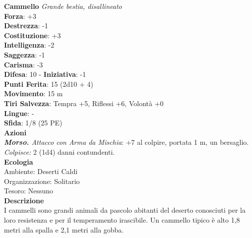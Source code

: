 \begin{multicols}{2}
\medskip\textbf{Cammello}
\emph{Grande bestia, disallineato}\\
\textbf{Forza}: +3\\
\textbf{Destrezza}: -1\\
\textbf{Costituzione}: +3\\
\textbf{Intelligenza}: -2\\
\textbf{Saggezza}: -1\\
\textbf{Carisma}: -3\\
\textbf{Difesa}: 10 - \textbf{Iniziativa}: -1\\
\textbf{Punti Ferita}: 15 (2d10 + 4)\\
\textbf{Movimento}: 15 m\\
\textbf{Tiri Salvezza}: Tempra +5, Riflessi +6, Volontà +0 \\
\textbf{Lingue}: -\\
\textbf{Sfida}: 1/8 (25 PE)\smallskip\\
\smallskip\textbf{Azioni}\\
\emph{\textbf{Morso.} Attacco con Arma da Mischia}: +7 al colpire, portata 1 m, un bersaglio.\\
\emph{Colpisce:} 2 (1d4) danni contundenti.\\
\textbf{Ecologia}\\
Ambiente: Deserti Caldi\\
Organizzazione: Solitario\\
Tesoro: Nessuno\\
\textbf{Descrizione}\\
I cammelli sono grandi animali da pascolo abitanti del deserto conosciuti per la loro resistenza e per il temperamento irascibile. Un cammello tipico è alto 1,8 metri alla spalla e 2,1 metri alla gobba. \\


\end{multicols}

